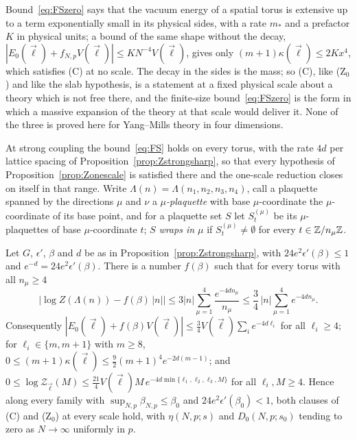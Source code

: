 Bound~\eqref{eq:FSzero} says that the vacuum energy of a spatial torus is
extensive up to a term exponentially small in its physical sides, with a
rate $m_*$ and a prefactor $K$ in physical units; a bound of the same shape
without the decay, $|E_0(\vec\ell)+f_{N,p}V(\vec\ell)|\le KN^{-4}V(\vec\ell)$,
gives only $(m+1)\kappa(\vec\ell)\le2Kx^4$, which satisfies (C) at no scale.
The decay in the sides is the mass; so (C), like (Z$_0$) and like the slab
hypothesis, is a statement at a fixed physical scale about a theory which
is not free there, and the finite-size bound~\eqref{eq:FSzero} is the form
in which a massive expansion of the theory at that scale would deliver it.
None of the three is proved here for Yang--Mills theory in four dimensions.

At strong coupling the bound~\eqref{eq:FS} holds on every torus, with the
rate $4d$ per lattice spacing of Proposition~\ref{prop:Zstrongsharp}, so
that every hypothesis of Proposition~\ref{prop:Zonescale} is satisfied
there and the one-scale reduction closes on itself in that range. Write
$\Lambda(n)=\Lambda(n_1,n_2,n_3,n_4)$, call a plaquette spanned by the
directions $\mu$ and $\nu$ a \emph{$\mu$-plaquette} with base
$\mu$-coordinate the $\mu$-coordinate of its base point, and for a
plaquette set $S$ let $S^{(\mu)}_t$ be its $\mu$-plaquettes of base
$\mu$-coordinate $t$; $S$ \emph{wraps in $\mu$} if $S^{(\mu)}_t\ne\emptyset$
for every $t\in\mathbb{Z}/n_\mu\mathbb{Z}$.

\begin{proposition}\label{prop:FSstrong}
Let $G$, $\epsilon'$, $\beta$ and $d$ be as in
Proposition~\ref{prop:Zstrongsharp}, with $24e^2\epsilon'(\beta)\le1$ and
$e^{-d}=24e^2\epsilon'(\beta)$. There is a number $f(\beta)$ such that for
every torus with all $n_\mu\ge4$
\[
\bigl|\log Z(\Lambda(n))-f(\beta)\,|n|\bigr|\le3|n|\sum_{\mu=1}^4\frac{e^{-4d
n_\mu}}{n_\mu}\le\frac34\,|n|\sum_{\mu=1}^4e^{-4dn_\mu}.
\]
Consequently $|E_0(\vec\ell)+f(\beta)V(\vec\ell)|\le\frac34V(\vec\ell)\sum_i
e^{-4d\ell_i}$ for all $\ell_i\ge4$; for $\ell_i\in\{m,m+1\}$ with $m\ge8$,
$0\le(m+1)\kappa(\vec\ell)\le\frac92(m+1)^4e^{-2d(m-1)}$; and $0\le\log
\mathcal Z_{\vec\ell}(M)\le\frac{21}4V(\vec\ell)M\,e^{-4d\min\{\ell_1,\ell_2,
\ell_3,M\}}$ for all $\ell_i,M\ge4$. Hence along every family with
$\sup_{N,p}\beta_{N,p}\le\beta_0$ and $24e^2\epsilon'(\beta_0)<1$, both
clauses of \textup{(C)} and \textup{(Z$_0$)} at every scale hold, with
$\eta(N,p;s)$ and $D_0(N,p;s_0)$ tending to zero as $N\to\infty$ uniformly
in $p$.
\end{proposition}


